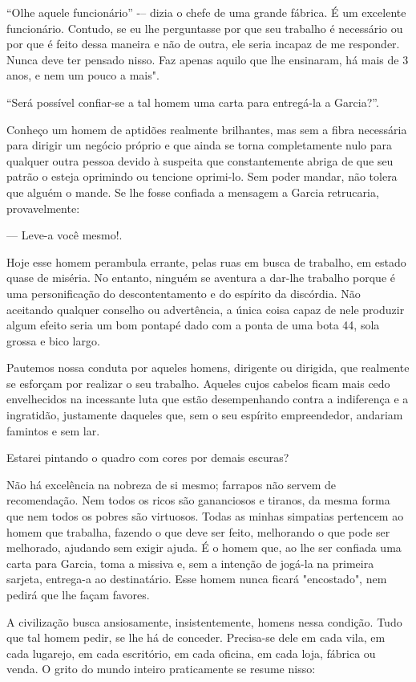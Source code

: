 ``Olhe aquele funcionário'' -–  dizia o chefe de uma grande fábrica. É um excelente funcionário. Contudo, se eu lhe perguntasse por que seu trabalho é necessário ou por que é feito dessa maneira e não de outra, ele seria incapaz de me responder. Nunca deve ter pensado nisso. Faz apenas aquilo que lhe ensinaram, há mais de 3 anos, e nem um pouco a mais".

``Será possível confiar-se a tal homem uma carta para entregá-la a Garcia?''.

Conheço um homem de aptidões realmente brilhantes, mas sem a fibra necessária para dirigir um negócio próprio e que ainda se torna completamente nulo para qualquer outra pessoa devido à suspeita que constantemente abriga de que seu patrão o esteja oprimindo ou tencione oprimi-lo. Sem poder mandar, não tolera que alguém o mande. Se lhe fosse confiada a mensagem a Garcia retrucaria, provavelmente:

--–  Leve-a você mesmo!.

Hoje esse homem perambula errante, pelas ruas em busca de trabalho, em estado quase de miséria. No entanto, ninguém se aventura a dar-lhe trabalho porque é uma personificação do descontentamento e do espírito da discórdia. Não aceitando qualquer conselho ou advertência, a única coisa capaz de nele produzir algum efeito seria um bom pontapé dado com a ponta de uma bota 44, sola grossa e bico largo.

Pautemos nossa conduta por aqueles homens, dirigente ou dirigida, que realmente se esforçam por realizar o seu trabalho. Aqueles cujos cabelos ficam mais cedo envelhecidos na incessante luta que estão desempenhando contra a indiferença e a ingratidão, justamente daqueles que, sem o seu espírito empreendedor, andariam famintos e sem lar.

Estarei pintando o quadro com cores por demais escuras?

Não há excelência na nobreza de si mesmo; farrapos não servem de recomendação. Nem todos os ricos são gananciosos e tiranos, da mesma forma que nem todos os pobres são virtuosos. Todas as minhas simpatias pertencem ao homem que trabalha, fazendo o que deve ser feito, melhorando o que pode ser melhorado, ajudando sem exigir ajuda. É o homem que, ao lhe ser confiada uma carta para Garcia, toma a missiva e, sem a intenção de jogá-la na primeira sarjeta, entrega-a ao destinatário. Esse homem nunca ficará "encostado", nem pedirá que lhe façam favores.

A civilização busca ansiosamente, insistentemente, homens nessa condição. Tudo que tal homem pedir, se lhe há de conceder. Precisa-se dele em cada vila, em cada lugarejo, em cada escritório, em cada oficina, em cada loja, fábrica ou venda. O grito do mundo inteiro praticamente se resume nisso:

